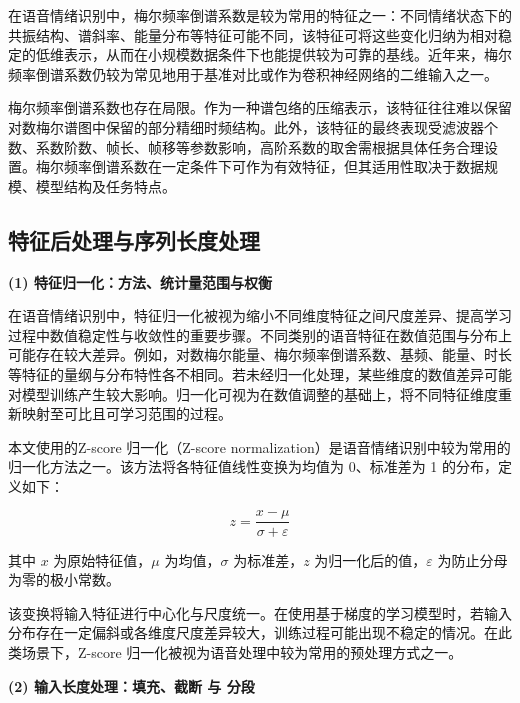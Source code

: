 在语音情绪识别中，梅尔频率倒谱系数是较为常用的特征之一：不同情绪状态下的共振结构、谱斜率、能量分布等特征可能不同，该特征可将这些变化归纳为相对稳定的低维表示，从而在小规模数据条件下也能提供较为可靠的基线。近年来，梅尔频率倒谱系数仍较为常见地用于基准对比或作为卷积神经网络的二维输入之一\cite{ma2023review,pappagari2023music,peng2021efficient}。

梅尔频率倒谱系数也存在局限。作为一种谱包络的压缩表示，该特征往往难以保留对数梅尔谱图中保留的部分精细时频结构。此外，该特征的最终表现受滤波器个数、系数阶数、帧长、帧移等参数影响，高阶系数的取舍需根据具体任务合理设置。梅尔频率倒谱系数在一定条件下可作为有效特征，但其适用性取决于数据规模、模型结构及任务特点\cite{peng2021efficient,chen2023dwformer}。



\subsection{特征后处理与序列长度处理}

\textbf{(1) 特征归一化：方法、统计量范围与权衡}

在语音情绪识别中，特征归一化被视为缩小不同维度特征之间尺度差异、提高学习过程中数值稳定性与收敛性的重要步骤\cite{ma2023review,leem2024selective,lin2023chunk}。不同类别的语音特征在数值范围与分布上可能存在较大差异。例如，对数梅尔能量、梅尔频率倒谱系数、基频、能量、时长等特征的量纲与分布特性各不相同\cite{pappagari2023music,peng2021efficient}。若未经归一化处理，某些维度的数值差异可能对模型训练产生较大影响\cite{zhang2020transfer}。归一化可视为在数值调整的基础上，将不同特征维度重新映射至可比且可学习范围的过程。

本文使用的Z-score 归一化（Z-score normalization）是语音情绪识别中较为常用的归一化方法之一\cite{zhang2020transfer,leem2024selective}。该方法将各特征值线性变换为均值为 0、标准差为 1 的分布，定义如下：

\begin{equation}
z = \frac{x-\mu}{\sigma + \varepsilon}
\end{equation}

其中 $x$ 为原始特征值，$\mu$ 为均值，$\sigma$ 为标准差，$z$ 为归一化后的值，$\varepsilon$ 为防止分母为零的极小常数。

该变换将输入特征进行中心化与尺度统一。在使用基于梯度的学习模型时，若输入分布存在一定偏斜或各维度尺度差异较大，训练过程可能出现不稳定的情况。在此类场景下，Z-score 归一化被视为语音处理中较为常用的预处理方式之一\cite{zhang2020transfer,leem2024selective,lin2023chunk}。

\textbf{(2) 输入长度处理：填充、截断 与 分段}

